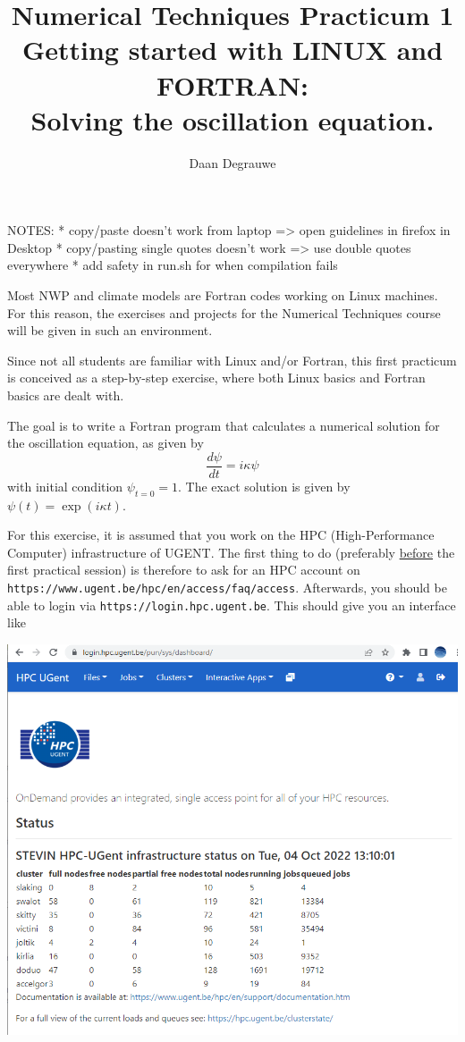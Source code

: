 \documentclass[a4paper]{article}
\title{%
	\bfseries%
	{\large Numerical Techniques Practicum 1}\\[3ex]
	{\Large Getting started with LINUX and FORTRAN:}\\[1ex]
	{\Large Solving the oscillation equation.}
}
\author{Daan Degrauwe}
\begin{document}
%
NOTES:
* copy/paste doesn't work from laptop => open guidelines in firefox in Desktop
* copy/pasting single quotes doesn't work => use double quotes everywhere
* add safety in run.sh for when compilation fails




\maketitle
%
\par
Most NWP and climate models are Fortran codes working on Linux machines. For this reason, the exercises and projects for the Numerical Techniques course will be given in such an environment.
%
\par
Since not all students are familiar with Linux and/or Fortran, this first practicum is conceived as a step-by-step exercise, where both Linux basics and Fortran basics are dealt with.
%
\par
The goal is to write a Fortran program that calculates a numerical solution for the oscillation equation, as given by
%
\begin{equation*}
	\frac{d\psi}{dt}=i\kappa\psi
\end{equation*}
%
with initial condition $\psi_{t=0}=1$. The exact solution is given by $\psi(t)=\exp(i\kappa t)$.
%
\par
For this exercise, it is assumed that you work on the HPC (High-Performance Computer) infrastructure of UGENT. The first thing to do (preferably \underline{before} the first practical session) is therefore to ask for an HPC account on \texttt{https://www.ugent.be/hpc/en/access/faq/access}. Afterwards, you should be able to login via \texttt{https://login.hpc.ugent.be}. This should give you an interface like
%
\begin{center}
	\includegraphics[scale=.4]{login_hpc}
\end{center}
\end{document}

